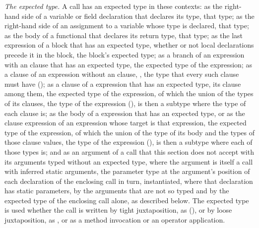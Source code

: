 \emph{The expected type.}
A call has an expected type in these contexts: as the right-hand side of a
variable or field declaration that declares its type, that type; as the
right-hand side of an assignment to a variable whose type is declared, that
type; as the body of a functional that declares its return type, that type;
as the last expression of a block that has an expected type, whether or not
local declarations precede it in the block, the block's expected type; as a
branch of an  expression with an  clause that has an
expected type, the expected type of the  expression; as a clause of an
 expression without an  clause, \TYP{()}, the type that
every such clause must have (); as a clause of a
 expression that has an expected type, its  clause
among them, the expected type of the  expression, of which the
union of the types of its clauses, the type of the  expression
(), is then a subtype where the type of each clause is;
as the body of a  expression that has an expected type, or as the
 clause expression of an  expression whose target is that
 expression, the expected type of the  expression, of
which the union of the type of its body and the types of those 
clause values, the type of the  expression (),
is then a subtype where each of those types is; and as an argument of a call
that this section does not accept with its arguments typed without an expected
type, where the argument is itself a call with inferred static arguments, the
parameter type at the argument's position of each declaration
of the enclosing call in turn, instantiated, where that declaration has static
parameters, by the arguments that are not so typed and by the expected type of
the enclosing call alone, as described below.
The expected type is used whether the call is written by tight juxtaposition,
as  (), or by loose juxtaposition, as
, or as a method invocation or an operator application.
